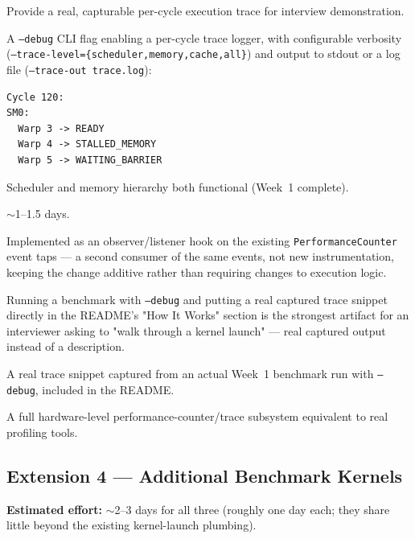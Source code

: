 \documentclass[11pt]{article}
\begin{document}
\begin{description}[leftmargin=1.2cm]
  \item[Purpose] Provide a real, capturable per-cycle execution trace for
  interview demonstration.
  \item[Implementation] A \texttt{--debug} CLI flag enabling a per-cycle
  trace logger, with configurable verbosity
  (\texttt{--trace-level=\{scheduler,memory,cache,all\}}) and output to
  stdout or a log file (\texttt{--trace-out trace.log}):
\begin{lstlisting}
Cycle 120:
SM0:
  Warp 3 -> READY
  Warp 4 -> STALLED_MEMORY
  Warp 5 -> WAITING_BARRIER
\end{lstlisting}
  \item[Dependencies] Scheduler and memory hierarchy both functional
  (Week~1 complete).
  \item[Estimated effort] $\sim$1--1.5 days.
  \item[Design notes] Implemented as an observer/listener hook on the
  existing \texttt{PerformanceCounter} event taps --- a second consumer of
  the same events, not new instrumentation, keeping the change additive
  rather than requiring changes to execution logic.
  \item[Why it matters] Running a benchmark with \texttt{--debug} and
  putting a real captured trace snippet directly in the README's "How It
  Works" section is the strongest artifact for an interviewer asking to
  "walk through a kernel launch" --- real captured output instead of a
  description.
  \item[Proof of done] A real trace snippet captured from an actual
  Week~1 benchmark run with \texttt{--debug}, included in the README.
  \item[Does not claim] A full hardware-level performance-counter/trace
  subsystem equivalent to real profiling tools.
\end{description}

\subsection{Extension 4 --- Additional Benchmark Kernels}

\textbf{Estimated effort:} $\sim$2--3 days for all three (roughly one day
each; they share little beyond the existing kernel-launch plumbing).
\end{document}
